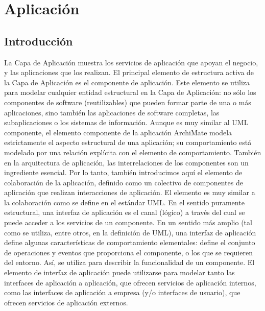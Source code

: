 \chapter{Aplicación}
\section{Introducción}
La Capa de Aplicación muestra los servicios de aplicación que apoyan el negocio, y las aplicaciones que los realizan.
El principal elemento de estructura activa de la Capa de Aplicación es el componente de aplicación. Este elemento se utiliza para modelar cualquier entidad estructural en la Capa de Aplicación: no sólo los componentes de software (reutilizables) que pueden formar parte de una o más aplicaciones, sino también las aplicaciones de software completas, las subaplicaciones o los sistemas de información. Aunque es muy similar al UML componente, el elemento componente de la aplicación ArchiMate modela estrictamente el aspecto estructural de una aplicación; su comportamiento está modelado por una relación explícita con el elemento de comportamiento.
También en la arquitectura de aplicación, las interrelaciones de los componentes son un ingrediente esencial. Por lo tanto, también introducimos aquí el elemento de colaboración de la aplicación, definido como un colectivo de componentes de aplicación que realizan interacciones de aplicación. El elemento es muy similar a la colaboración como se define en el estándar UML.
En el sentido puramente estructural, una interfaz de aplicación es el canal (lógico) a través del cual se puede acceder a los servicios de un componente. En un sentido más amplio (tal como se utiliza, entre otros, en la definición de UML), una interfaz de aplicación define algunas características de comportamiento elementales: define el conjunto de operaciones y eventos que proporciona el componente, o los que se requieren del entorno. Así, se utiliza para describir la funcionalidad de un componente. El elemento de interfaz de aplicación puede utilizarse para modelar tanto las interfaces de aplicación a aplicación, que ofrecen servicios de aplicación internos, como las interfaces de aplicación a empresa (y/o interfaces de usuario), que ofrecen servicios de aplicación externos.


